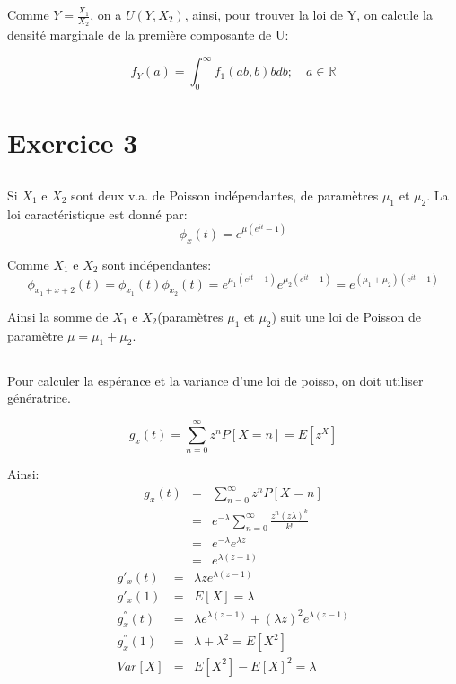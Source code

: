 \documentclass[a4paper]{article}
\begin{document}
Comme $Y=\frac{X_1}{X_2}$, on a $U(Y,X_2)$, ainsi,  pour trouver la loi de Y, on
calcule la densité marginale de la première composante de U:

\begin{equation}
f_Y(a)=\int_0^\infty f_1(ab,b)bdb ; \quad a \in \mathbb{R}
\end{equation}


\section{Exercice 3}

\subsection{}
Si $X_1$ e $X_2$ sont deux  v.a. de Poisson indépendantes, de paramètres $\mu_1$
et $\mu_2$. La loi caractéristique est donné par:
\begin{equation}
  \phi_x(t)=e^{\mu(e^{it}-1)}
\end{equation}

Comme $X_1$ e $X_2$ sont indépendantes:
\begin{equation}
  \phi_{x_1+x+2}(t)=\phi_{x_1}(t)\phi_{x_2}(t)=e^{\mu_1(e^{it}-1)}e^{\mu_2(e^{it}-1)}=
  e^{(\mu_1+\mu_2)(e^{it}-1)}
\end{equation}

Ainsi la somme  de $X_1$ e $X_2$(paramètres $\mu_1$ et $\mu_2$)  suit une loi de
Poisson de paramètre $\mu=\mu_1+\mu_2$.

\subsection{}
Pour calculer la espérance et la  variance d'une loi de poisso, on doit utiliser
génératrice.

\begin{equation}
  g_x(t)=\sum_{n=0}^{\infty}z^nP[X=n]=E[z^X]
\end{equation}

Ainsi:
\begin{eqnarray*}
  g_x(t)&=& \sum_{n=0}^{\infty}z^nP[X=n]\\
  &=& e^{-\lambda}\sum_{n=0}^{\infty}\frac{z^n(z\lambda)^k}{k!}\\
  &=& e^{-\lambda}e^{\lambda z}\\
  &=& e^{\lambda(z-1)}
\end{eqnarray*}
\begin{eqnarray*}
  g'_x(t)&=& \lambda ze^{\lambda(z-1)}\\
  g'_x(1)&=&E[X]= \lambda\\
  g^{''}_x(t)&=& \lambda e^{\lambda(z-1)}+(\lambda z)^2e^{\lambda(z-1)}\\
  g^{''}_x(1)&=& \lambda + \lambda^2 = E[X^2]\\
  Var[X] &=& E[X^2]-E[X]^2 = \lambda
\end{eqnarray*}
\end{document}
